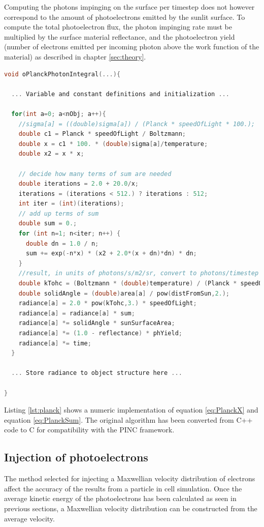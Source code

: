 Computing the photons impinging on the surface per timestep does not however correspond to the amount of photoelectrons emitted by the sunlit surface. To compute the total photoelectron flux, the photon impinging rate must be multiplied by the surface material reflectance, and the photoelectron yield (number of electrons emitted per incoming photon above the work function of the material) as described in chapter \ref{sec:theory}.

\begin{minipage}{\linewidth}
\begin{lstlisting}[language=C, caption={Numerical integration of Planck's law in terms of photon flux}, label={lst:planck}]
void oPlanckPhotonIntegral(...){

  ... Variable and constant definitions and initialization ...
    
  for(int a=0; a<nObj; a++){
	//sigma[a] = ((double)sigma[a]) / (Planck * speedOfLight * 100.);
	double c1 = Planck * speedOfLight / Boltzmann;
	double x = c1 * 100. * (double)sigma[a]/temperature;
	double x2 = x * x;

	// decide how many terms of sum are needed
	double iterations = 2.0 + 20.0/x;
	iterations = (iterations < 512.) ? iterations : 512;
	int iter = (int)(iterations);
	// add up terms of sum
	double sum = 0.;
	for (int n=1; n<iter; n++) {
	  double dn = 1.0 / n;
	  sum += exp(-n*x) * (x2 + 2.0*(x + dn)*dn) * dn;
	}
	//result, in units of photons/s/m2/sr, convert to photons/timestep
	double kTohc = (Boltzmann * (double)temperature) / (Planck * speedOfLight);
	double solidAngle = (double)area[a] / pow(distFromSun,2.);
	radiance[a] = 2.0 * pow(kTohc,3.) * speedOfLight;
	radiance[a] = radiance[a] * sum;
	radiance[a] *= solidAngle * sunSurfaceArea;
	radiance[a] *= (1.0 - reflectance) * phYield;
	radiance[a] *= time;
  }
    
  ... Store radiance to object structure here ...

}
\end{lstlisting}
\end{minipage}

Listing \ref{lst:planck} shows a numeric implementation of equation \eqref{eq:PlanckX} and equation \eqref{eq:PlanckSum}. The original algorithm \parencite{Blackbody} has been converted from C++ code to C for compatibility with the PINC framework.


\subsection{Injection of photoelectrons}\label{subsec:injection}
The method selected for injecting a Maxwellian velocity distribution of electrons affect the accuracy of the results from a particle in cell simulation. Once the average kinetic energy of the photoelectrons has been calculated as seen in previous sections, a Maxwellian velocity distribution can be constructed from the average velocity. 


